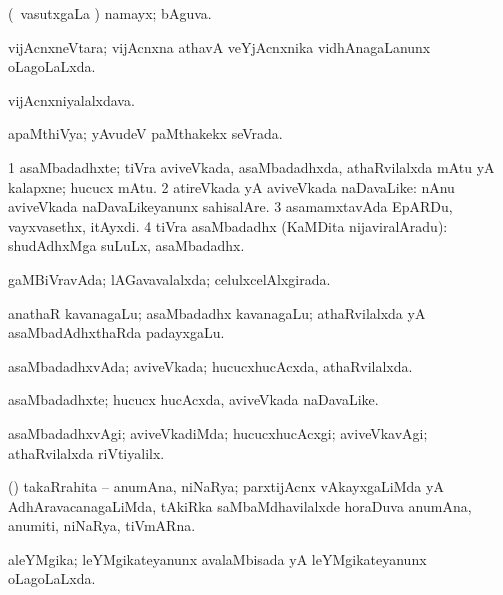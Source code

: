 \bentry
{}
\gl{\gu}
\bmng
(\kanmu\ vasutxgaLa \vi) namayx; bAguva. 
\emng
\eentry

\bentry
{}
\gl{\gu}
\bmng
vijAcnxneVtara; vijAcnxna athavA veYjAcnxnika vidhAnagaLanunx oLagoLaLxda. 
\emng
\eentry

\bentry
{}
\gl{\nA}
\bmng
vijAcnxniyalalxdava. 
\emng
\eentry

\bentry
{}
\gl{\gu}
\bmng
apaMthiVya; yAvudeV paMthakekx seVrada. 
\emng
\eentry

\bentry
{}
\gl{\nA}
\bmng
\bnum
\num{1} asaMbadadhxte; tiVra aviveVkada, asaMbadadhxda, athaRvilalxda mAtu yA kalapxne; hucucx mAtu. 
\num{2} atireVkada yA aviveVkada naDavaLike:  nAnu aviveVkada naDavaLikeyanunx sahisalAre. 
\num{3} asamamxtavAda EpARDu, vayxvasethx, itAyxdi. 
\num{4} tiVra asaMbadadhx (KaMDita nijaviralAradu):  shudAdhxMga suLuLx, asaMbadadhx. 
\enum
\emng

\noindent
\gl{\pagu}
\bmng
{} gaMBiVravAda; lAGavavalalxda; celulxcelAlxgirada. 
\emng
\eentry

\bentry
{}
\gl{\nA}
\bmng
anathaR kavanagaLu; asaMbadadhx kavanagaLu; athaRvilalxda yA asaMbadAdhxthaRda padayxgaLu. 
\emng
\eentry

\bentry
{}
\gl{\gu}
\bmng
asaMbadadhxvAda; aviveVkada; hucucxhucAcxda, athaRvilalxda. 
\emng
\eentry

\bentry
{}
\gl{\nA}
\bmng
asaMbadadhxte; hucucx hucAcxda, aviveVkada naDavaLike. 
\emng
\eentry

\bentry
{}
\gl{\kirxvi}
\bmng
asaMbadadhxvAgi; aviveVkadiMda; hucucxhucAcxgi; aviveVkavAgi; athaRvilalxda riVtiyalilx. 
\emng
\eentry

\bentry
{}
\gl{\nA}
\expl{\Latin}
\bmng
(\takaR) takaRrahita -- anumAna, niNaRya; parxtijAcnx vAkayxgaLiMda yA AdhAravacanagaLiMda, tAkiRka saMbaMdhavilalxde horaDuva anumAna, anumiti, niNaRya, tiVmARna. 
\emng
\eentry

\bentry
{}
\gl{\gu}
\bmng
aleYMgika; leYMgikateyanunx avalaMbisada yA leYMgikateyanunx oLagoLaLxda. 
\emng
\eentry

